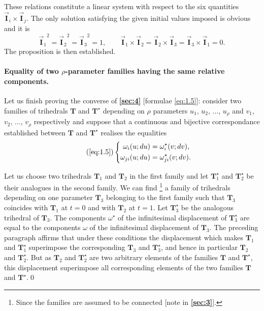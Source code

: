\documentclass[leqno,11pt]{book}
\numberwithin{equation}{chapter}
\theoremstyle{shape1}
\theoremstyle{shapesmall}
\newcommand{\fsref}[1]{{\rm\textsection\textbf{\ref{sec:#1}}}}
\newcommand{\rvec}[1]{\vec{\mathbf{#1}}}
\newcommand{\ivec}{\rvec{I}}
\begin{document}
These relations constitute a linear system with respect to the six quantities $\ivec_{i}\times\ivec_{j}$. The only solution satisfying the given initial values imposed is obvious and it is
\[
{\ivec_{1}}^{2}=
{\ivec_{2}}^{2}=
{\ivec_{3}}^{2}=1,\qquad
\ivec_{1}\times\ivec_{2}=
\ivec_{2}\times\ivec_{3}=
\ivec_{3}\times\ivec_{1}=0.
\]
The proposition is then established.

\paragraph{Equality of two $\rho$-parameter families having the same relative components.}
\label{sec:6}
Let us finish proving the converse of \fsref{4} [formulae \eqref{eq:1.5}]: consider two families of trihedrals $\mathbf{T}$ and $\mathbf{T}^{\star}$ depending on $\rho$ parameters $u_{1}$, $u_{2}$, $\dots$, $u_{\rho}$ and $v_{1}$, $v_{2}$, $\dots$, $v_{\rho}$ respectively and suppose that a continuous and bijective correspondance established between $\mathbf{T}$ and $\mathbf{T}^{\star}$ realises the equalities
\begin{equation}
  \label{eq:1.5a}\tag{\ref{eq:1.5}}
  \left\{
    \begin{aligned}
      \omega_{i}(u;du)&=\omega^{\star}_{i}(v;dv),\\
      \omega_{ji}(u;du)&=\omega^{\star}_{ji}(v;dv).
    \end{aligned}
  \right.
\end{equation}

Let us choose two trihedrals $\mathbf{T}_{1}$ and $\mathbf{T}_{2}$ in the first family and let $\mathbf{T}_{1}^{\star}$ and $\mathbf{T}_{2}^{\star}$ be their analogues in the second family. We can find \footnote{Since the families are assumed to be connected [note in \fsref{3}].} a family of trihedrals depending on one parameter $\mathbf{T}_{3}$ belonging to the first family such that $\mathbf{T}_{3}$ coincides with $\mathbf{T}_{1}$ at $t=0$ and with $\mathbf{T}_{2}$ at $t=1$. Let $\mathbf{T}_{3}^{\star}$ be the analogous trihedral of $\mathbf{T}_{3}$. The components $\omega^{\star}$ of the infinitesimal displacement of $\mathbf{T}_{3}^{\star}$ are equal to the components $\omega$ of the infinitesimal displacement of $\mathbf{T}_{3}$. The preceding paragraph affirms that under these conditions the displacement which makes $\mathbf{T}_{1}$ and $\mathbf{T}_{1}^{\star}$ superimpose the corresponding $\mathbf{T}_{3}$ and $\mathbf{T}_{3}^{\star}$, and hence in particular $\mathbf{T}_{2}$ and $\mathbf{T}_{2}^{\star}$. But as $\mathbf{T}_{2}$ and $\mathbf{T}_{2}^{\star}$ are two arbitrary elements of the families $\mathbf{T}$ and $\mathbf{T}^{\star}$, this displacement superimpose all corresponding elements of the two families $\mathbf{T}$ and $\mathbf{T}^{\star}$.\qed
\end{document}
